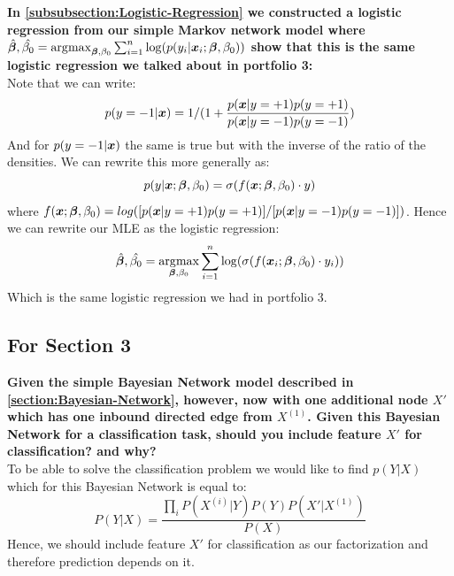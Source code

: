 \begin{appendices}
\begin{question}\label{question:logistic-regression}
    \textbf{In \cref{subsubsection:Logistic-Regression} we constructed a logistic regression from our simple Markov network model where $\hat{\bm{\beta}}, \hat{\beta_{0}} = \operatorname*{arg\!\max}_{\bm{\beta}, \beta_{0}} \sum_{i=1}^{n} \log(p(y_{i}|\bm{x}_{i};\bm{\beta},\beta_{0}))$ show that this is the same logistic regression we talked about in portfolio 3:} \\
    Note that we can write:
    \begin{equation}
        p(y=-1| \bm{x}) = 1 / (1+ \frac{p(\bm{x}|y=+1)p(y=+1)}{p(\bm{x}|y=-1) p(y=-1)})
    \end{equation}
    And for $p(y=-1|\bm{x})$ the same is true but with the inverse of the ratio of the densities. We can rewrite this more generally as:
    \begin{equation}
        p(y | \bm{x}; \bm{\beta}, \beta_{0}) = \sigma(f(\bm{x};\bm{\beta}, \beta_{0}) \cdot y)
    \end{equation}
    where $f(\bm{x};\bm{\beta}, \beta_{0}) = log( [p(\bm{x}|y=+1)p(y=+1)] / [p(\bm{x}|y=-1) p(y=-1)] )$. Hence we can rewrite our MLE as the logistic regression:
    \begin{equation}
        \hat{\bm{\beta}}, \hat{\beta_{0}} = \operatorname*{arg\!\max}_{\bm{\beta}, \beta_{0}} \sum_{i=1}^{n} \log (\sigma(f(\bm{x}_{i};\bm{\beta}, \beta_{0}) \cdot y_{i}))
    \end{equation}
    Which is the same logistic regression we had in portfolio 3.
\end{question}


\subsection{For Section 3}
\begin{question}
    \textbf{Given the simple Bayesian Network model described in \cref{section:Bayesian-Network}, however, now with one additional node $X'$ which has one inbound directed edge from $X^{(1)}$. Given this Bayesian Network for a classification task, should you include feature $X'$ for classification? and why?} \\
    To be able to solve the classification problem we would like to find $p(Y|X)$ which for this Bayesian Network is equal to:
    \begin{equation}
        P(Y|X) = \frac{\prod_{i} P(X^{(i)} | Y) P(Y)P(X' | X^{(1)}) }{P(X)}
    \end{equation}
    Hence, we should include feature $X'$ for classification as our factorization and therefore prediction depends on it. 
\end{question}


\end{appendices}